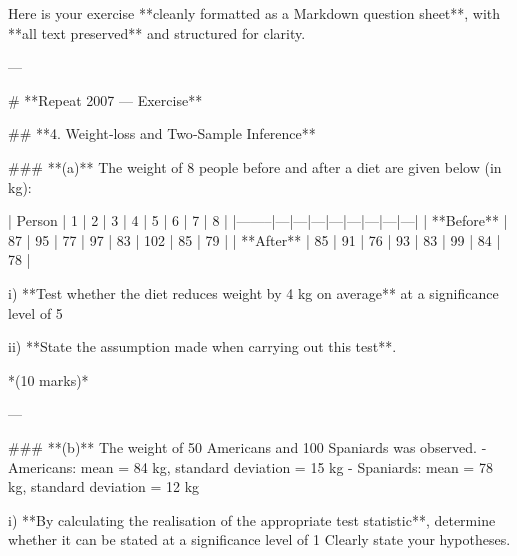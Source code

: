 Here is your exercise **cleanly formatted as a Markdown question sheet**, with **all text preserved** and structured for clarity.

---

# **Repeat 2007 — Exercise**

## **4. Weight‑loss and Two‑Sample Inference**

### **(a)**  
The weight of 8 people before and after a diet are given below (in kg):

| Person | 1 | 2 | 3 | 4 | 5 | 6 | 7 | 8 |
|--------|---|---|---|---|---|---|---|---|
| **Before** | 87 | 95 | 77 | 97 | 83 | 102 | 85 | 79 |
| **After**  | 85 | 91 | 76 | 93 | 83 | 99 | 84 | 78 |

i) **Test whether the diet reduces weight by 4 kg on average** at a significance level of 5%

ii) **State the assumption made when carrying out this test**.

*(10 marks)*

---

### **(b)**  
The weight of 50 Americans and 100 Spaniards was observed.  
- Americans: mean = 84 kg, standard deviation = 15 kg  
- Spaniards: mean = 78 kg, standard deviation = 12 kg  

i) **By calculating the realisation of the appropriate test statistic**, determine whether it can be stated at a significance level of 1%
Clearly state your hypotheses.
